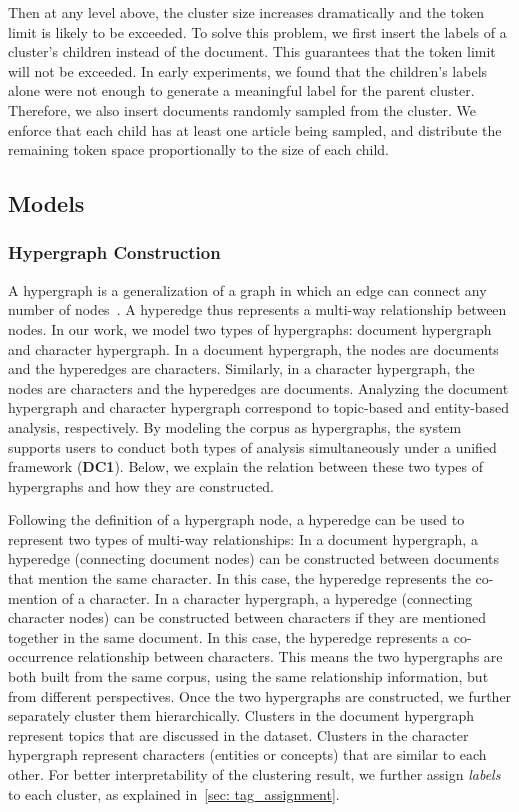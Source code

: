 Then at any level above, the cluster size increases dramatically and the token limit is likely to be exceeded.
To solve this problem, we first insert the labels of a cluster's children instead of the document.
This guarantees that the token limit will not be exceeded.
In early experiments, we found that the children's labels alone were not enough to generate a meaningful label for the parent cluster.
Therefore, we also insert documents randomly sampled from the cluster.
We enforce that each child has at least one article being sampled, and distribute the remaining token space proportionally to the size of each child.

\subsection{Models}
\subsubsection{Hypergraph Construction}
A hypergraph is a generalization of a graph in which an edge can connect any number of nodes~\cite{fischer2021hypergraphsurvey}.
A hyperedge thus represents a multi-way relationship between nodes.
In our work, we model two types of hypergraphs: document hypergraph and character hypergraph.
In a document hypergraph, the nodes are documents and the hyperedges are characters.
Similarly, in a character hypergraph, the nodes are characters and the hyperedges are documents.
Analyzing the document hypergraph and character hypergraph correspond to topic-based and entity-based analysis, respectively.
By modeling the corpus as hypergraphs, the system supports users to conduct both types of analysis simultaneously under a unified framework (\textbf{DC1}).
Below, we explain the relation between these two types of hypergraphs and how they are constructed.

Following the definition of a hypergraph node, a hyperedge can be used to represent two types of multi-way relationships:
In a document hypergraph, a hyperedge (connecting document nodes) can be constructed between documents that mention the same character. 
In this case, the hyperedge represents the co-mention of a character.
In a character hypergraph, a hyperedge (connecting character nodes) can be constructed between characters if they are mentioned together in the same document.
In this case, the hyperedge represents a co-occurrence relationship between characters.
This means the two hypergraphs are both built from the same corpus, using the same relationship information, but from different perspectives.
Once the two hypergraphs are constructed, we further separately cluster them hierarchically.
Clusters in the document hypergraph represent topics that are discussed in the dataset.
Clusters in the character hypergraph represent characters (entities or concepts) that are similar to each other.
For better interpretability of the clustering result, we further assign \textit{labels} to each cluster, as explained in~\autoref{sec: tag_assignment}.

